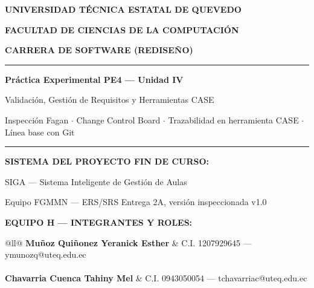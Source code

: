 \documentclass[11pt,letterpaper]{article}
\begin{document}
\begin{titlepage}
\centering
\vspace*{6mm}
{\bfseries\Large UNIVERSIDAD TÉCNICA ESTATAL DE QUEVEDO\par}
\vspace{2mm}
{\bfseries\large FACULTAD DE CIENCIAS DE LA COMPUTACIÓN\par}
{\bfseries\large CARRERA DE SOFTWARE (REDISEÑO)\par}
\vspace{12mm}
{\color{uteqverde}\rule{\textwidth}{1.2pt}}
\vspace{4mm}

{\bfseries\LARGE Práctica Experimental PE4 --- Unidad IV\par}
\vspace{3mm}
{\large Validación, Gestión de Requisitos y Herramientas CASE\par}
\vspace{2mm}
{\normalsize Inspección Fagan $\cdot$ Change Control Board $\cdot$ Trazabilidad en herramienta CASE $\cdot$ Línea base con Git\par}
\vspace{4mm}
{\color{uteqverde}\rule{\textwidth}{1.2pt}}
\vspace{10mm}

{\bfseries SISTEMA DEL PROYECTO FIN DE CURSO:\par}
\vspace{1mm}
{\large SIGA --- Sistema Inteligente de Gestión de Aulas\par}
{\small Equipo FGMMN --- ERS/SRS Entrega 2A, versión inspeccionada v1.0\par}
\vspace{8mm}

{\bfseries EQUIPO H --- INTEGRANTES Y ROLES:\par}
\vspace{2mm}
\begin{tabular}{@{}ll@{}}
\textbf{Muñoz Quiñonez Yeranick Esther} & C.I. 1207929645 --- ymunozq@uteq.edu.ec \\
 \\[2mm]
\textbf{Chavarria Cuenca Tahiny Mel} & C.I. 0943050054 --- tchavarriac@uteq.edu.ec \\
 \\
\end{tabular}
\vspace{6mm}


\end{titlepage}
\end{document}
